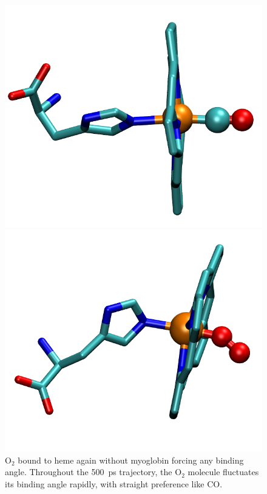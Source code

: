 \documentclass{article}
\begin{document}
\begin{figure}
  \centering
  \begin{minipage}{0.4\textwidth}
    \centering
    \includegraphics[width=\linewidth]{coheme.png}
    \caption{CO bound to heme in the absence of myoglobin's surrounding structure.  This is a snapshot from a \SI{500}{\pico\second} trajectory in water.  Note that it prefers a near-straight angle.}
    \label{fig:coheme}
  \end{minipage}
  \hfill
  \begin{minipage}{0.5\textwidth}
    \centering
    \includegraphics[width=\linewidth]{o2heme.png}
    \caption{O$_2$ bound to heme again without myoglobin forcing any binding angle.  Throughout the \SI{500}{\pico\second} trajectory, the O$_2$ molecule fluctuates its binding angle rapidly, with straight preference like CO.}
    \label{fig:o2heme}
  \end{minipage}
\end{figure}
\end{document}
